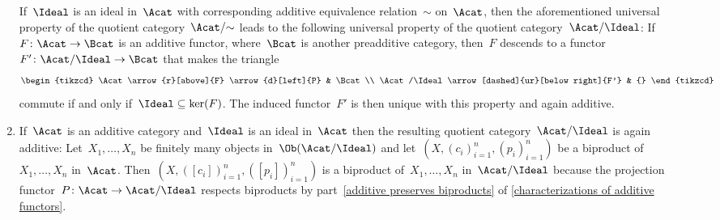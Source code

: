 \begin{remark*}
\begin{enumerate}
      If~$\Ideal$ is an ideal in~$\Acat$ with corresponding additive equivalence relation~$\sim$ on~$\Acat$, then the aforementioned universal property of the quotient category~$\Acat/{\sim}$ leads to the following universal property of the quotient category~$\Acat/\Ideal$:
      If~$F \colon \Acat \to \Bcat$ is an additive functor, where~$\Bcat$ is another preadditive category, then~$F$ descends to a functor~$F' \colon \Acat/\Ideal \to \Bcat$ that makes the triangle
      \[
        \begin{tikzcd}
            \Acat
            \arrow{r}[above]{F}
            \arrow{d}[left]{P}
          & \Bcat
          \\
            \Acat/\Ideal
            \arrow[dashed]{ur}[below right]{F'}
          & {}
        \end{tikzcd}
      \]
      commute if and only if~$\Ideal \subseteq \ker(F)$.
      The induced functor~$F'$ is then unique with this property and again additive.
    \item
      If~$\Acat$ is an additive category and~$\Ideal$ is an ideal in~$\Acat$ then the resulting quotient category~$\Acat/\Ideal$ is again additive:
      Let~$X_1, \dotsc, X_n$ be finitely many objects in~$\Ob(\Acat/\Ideal)$ and let~$(X, (c_i)_{i=1}^n, (p_i)_{i=1}^n)$ be a biproduct of~$X_1, \dotsc, X_n$ in~$\Acat$.
      Then~$(X, ([c_i])_{i=1}^n, ([p_i])_{i=1}^n)$ is a biproduct of~$X_1, \dotsc, X_n$ in~$\Acat/\Ideal$ because the projection functor~$P \colon \Acat \to \Acat/\Ideal$ respects biproducts by part~\ref{additive preserves biproducts} of \cref{characterizations of additive functors}.
  \end{enumerate}
\end{remark*}


